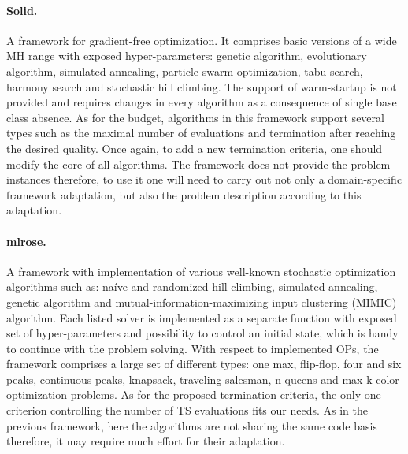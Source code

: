 \paragraph{Solid.} A framework for gradient-free optimization. It comprises basic versions of a wide MH range with exposed hyper-parameters: genetic algorithm, evolutionary algorithm, simulated annealing, particle swarm optimization, tabu search, harmony search and stochastic hill climbing. The support of warm-startup is not provided and requires changes in every algorithm as a consequence of single base class absence. As for the budget, algorithms in this framework support several types such as the maximal number of evaluations and termination after reaching the desired quality. Once again, to add a new termination criteria, one should modify the core of all algorithms. The framework does not provide the problem instances therefore, to use it one will need to carry out not only a domain-specific framework adaptation, but also the problem description according to this adaptation.

\paragraph{mlrose.} A framework with implementation of various well-known stochastic optimization algorithms such as: na\'ive and randomized hill climbing, simulated annealing, genetic algorithm and mutual-information-maximizing input clustering (MIMIC) algorithm. Each listed solver is implemented as a separate function with exposed set of hyper-parameters and possibility to control an initial state, which is handy to continue with the problem solving. With respect to implemented OPs, the framework comprises a large set of different types: one max, flip-flop, four and six peaks, continuous peaks, knapsack, traveling salesman, n-queens and max-k color optimization problems. As for the proposed termination criteria, the only one criterion controlling the number of TS evaluations fits our needs. As in the previous framework, here the algorithms are not sharing the same code basis therefore, it may require much effort for their adaptation.

